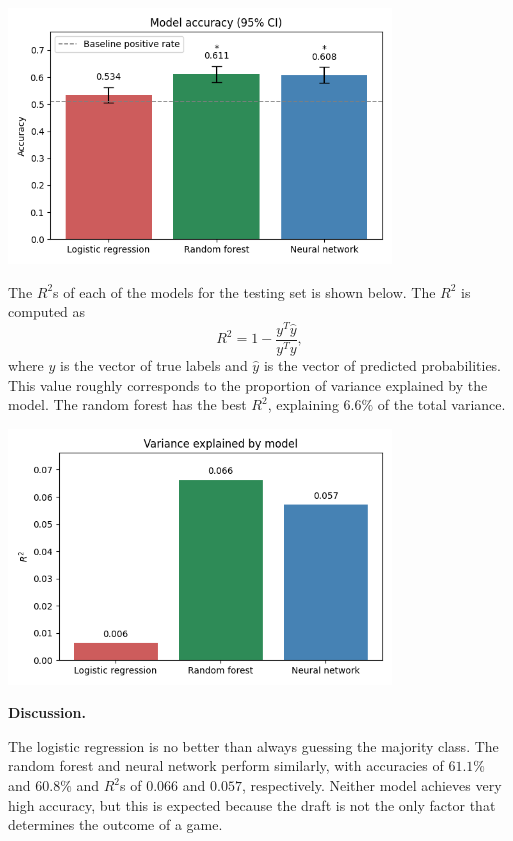 \documentclass[12pt]{article}
\begin{document}
\begin{center} \includegraphics[width=4in]{"../output/acc.png"} \end{center}

The $R^{2}$s of each of the models for the testing set is shown below. The $R^{2}$ is computed as 
$$R^{2} = 1 - \frac{y^{T}\hat{y}}{y^{T}y},$$
where $y$ is the vector of true labels and $\hat{y}$ is the vector of predicted probabilities. This value roughly corresponds to the proportion of variance explained by the model. The random forest has the best $R^{2}$, explaining $6.6\%$ of the total variance.

\begin{center} \includegraphics[width=4in]{"../output/r2.png"} \end{center}

\textbf{Discussion.}

The logistic regression is no better than always guessing the majority class. The random forest and neural network perform similarly, with accuracies of $61.1\%$ and $60.8\%$ and $R^{2}$s of $0.066$ and $0.057$, respectively. Neither model achieves very high accuracy, but this is expected because the draft is not the only factor that determines the outcome of a game.
\end{document}
